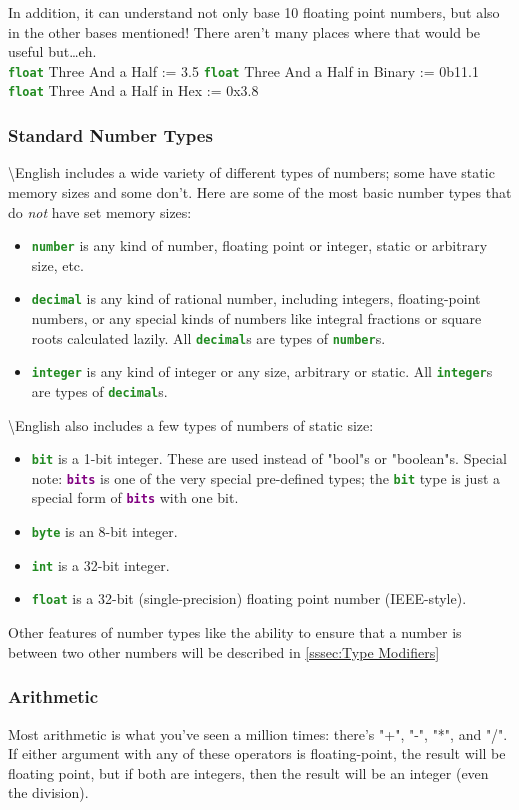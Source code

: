 \documentclass{article}
\newcommand{\name}{\textbackslash{}English}				%
\newcommand{\sssecl}[1]{\subsubsection{#1}\label{sssec:#1}}
\newcommand{\type}[1]{\texttt{\textcolor{ForestGreen}{\textbf{#1}}}}
\newcommand{\keyop}[1]{\texttt{\textcolor{Purple}{\textbf{#1}}}}
\newenvironment{code}[0]
{\ttfamily{}				%
\setlength\parindent{0cm}	%
~\\}
{\setlength\parindent{1cm}
~\\}
\begin{document}
\indent In addition, it can understand not only base 10 floating point numbers, but also in the other bases mentioned! There aren't many places where that would be useful but\ldots{}eh.
\begin{code}
\type{float} Three And a Half := 3.5
\type{float} Three And a Half in Binary := 0b11.1
\type{float} Three And a Half in Hex := 0x3.8
\end{code}

\sssecl{Standard Number Types}
\indent \name{} includes a wide variety of different types of numbers; some have static memory sizes and some don't. Here are some of the most basic number types that do \emph{not} have set memory sizes:
\begin{itemize}
	\item \type{number} is any kind of number, floating point or integer, static or arbitrary size, etc.
	\item \type{decimal} is any kind of rational number, including integers, floating-point numbers, or any special kinds of numbers like integral fractions or square roots calculated lazily. All \type{decimal}s are types of \type{number}s.
	\item \type{integer} is any kind of integer or any size, arbitrary or static. All \type{integer}s are types of \type{decimal}s.
\end{itemize}

\indent \name{} also includes a few types of numbers of static size:
\begin{itemize}
	\item \type{bit} is a 1-bit integer. These are used instead of "bool"s or "boolean"s. Special note: \keyop{bits} is one of the very special pre-defined types; the \type{bit} type is just a special form of \keyop{bits} with one bit.
	\item \type{byte} is an 8-bit integer.
	\item \type{int} is a 32-bit integer.
	\item \type{float} is a 32-bit (single-precision) floating point number (IEEE-style).
\end{itemize}

\indent Other features of number types like the ability to ensure that a number is between two other numbers will be described in \ref{sssec:Type Modifiers}

\sssecl{Arithmetic}
\indent Most arithmetic is what you've seen a million times: there's "+", "-", "*", and "/". If either argument with any of these operators is floating-point, the result will be floating point, but if both are integers, then the result will be an integer (even the division).
\end{document}
